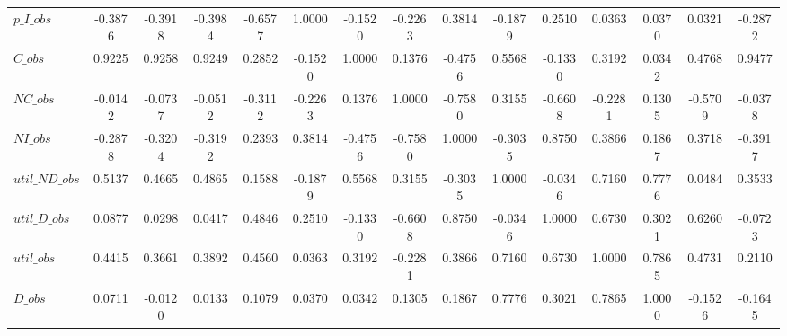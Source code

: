 \begin{center}
\begin{longtable}{lcccccccccccccc}
$p\_I\_obs      $	 & 	          -0.3876	 & 	          -0.3918	 & 	          -0.3984	 & 	          -0.6577	 & 	           1.0000	 & 	          -0.1520	 & 	          -0.2263	 & 	           0.3814	 & 	          -0.1879	 & 	           0.2510	 & 	           0.0363	 & 	           0.0370	 & 	           0.0321	 & 	          -0.2872 \\ 
$C\_obs         $	 & 	           0.9225	 & 	           0.9258	 & 	           0.9249	 & 	           0.2852	 & 	          -0.1520	 & 	           1.0000	 & 	           0.1376	 & 	          -0.4756	 & 	           0.5568	 & 	          -0.1330	 & 	           0.3192	 & 	           0.0342	 & 	           0.4768	 & 	           0.9477 \\ 
$NC\_obs        $	 & 	          -0.0142	 & 	          -0.0737	 & 	          -0.0512	 & 	          -0.3112	 & 	          -0.2263	 & 	           0.1376	 & 	           1.0000	 & 	          -0.7580	 & 	           0.3155	 & 	          -0.6608	 & 	          -0.2281	 & 	           0.1305	 & 	          -0.5709	 & 	          -0.0378 \\ 
$NI\_obs        $	 & 	          -0.2878	 & 	          -0.3204	 & 	          -0.3192	 & 	           0.2393	 & 	           0.3814	 & 	          -0.4756	 & 	          -0.7580	 & 	           1.0000	 & 	          -0.3035	 & 	           0.8750	 & 	           0.3866	 & 	           0.1867	 & 	           0.3718	 & 	          -0.3917 \\ 
$util\_ND\_obs  $	 & 	           0.5137	 & 	           0.4665	 & 	           0.4865	 & 	           0.1588	 & 	          -0.1879	 & 	           0.5568	 & 	           0.3155	 & 	          -0.3035	 & 	           1.0000	 & 	          -0.0346	 & 	           0.7160	 & 	           0.7776	 & 	           0.0484	 & 	           0.3533 \\ 
$util\_D\_obs   $	 & 	           0.0877	 & 	           0.0298	 & 	           0.0417	 & 	           0.4846	 & 	           0.2510	 & 	          -0.1330	 & 	          -0.6608	 & 	           0.8750	 & 	          -0.0346	 & 	           1.0000	 & 	           0.6730	 & 	           0.3021	 & 	           0.6260	 & 	          -0.0723 \\ 
$util\_obs      $	 & 	           0.4415	 & 	           0.3661	 & 	           0.3892	 & 	           0.4560	 & 	           0.0363	 & 	           0.3192	 & 	          -0.2281	 & 	           0.3866	 & 	           0.7160	 & 	           0.6730	 & 	           1.0000	 & 	           0.7865	 & 	           0.4731	 & 	           0.2110 \\ 
$D\_obs         $	 & 	           0.0711	 & 	          -0.0120	 & 	           0.0133	 & 	           0.1079	 & 	           0.0370	 & 	           0.0342	 & 	           0.1305	 & 	           0.1867	 & 	           0.7776	 & 	           0.3021	 & 	           0.7865	 & 	           1.0000	 & 	          -0.1526	 & 	          -0.1645 \\ 

\end{longtable}
\end{center}
